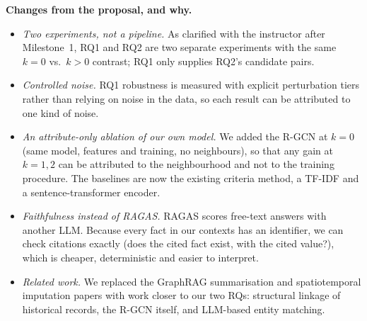 \textbf{Changes from the proposal, and why.}
\begin{itemize}
\item \emph{Two experiments, not a pipeline.} As clarified with the instructor after Milestone~1, RQ1 and RQ2 are two separate experiments with the same $k=0$ vs.\ $k>0$ contrast; RQ1 only supplies RQ2's candidate pairs.
\item \emph{Controlled noise.} RQ1 robustness is measured with explicit perturbation tiers rather than relying on noise in the data, so each result can be attributed to one kind of noise.
\item \emph{An attribute-only ablation of our own model.} We added the R-GCN at $k=0$ (same model, features and training, no neighbours), so that any gain at $k=1,2$ can be attributed to the neighbourhood and not to the training procedure. The baselines are now the existing criteria method, a TF-IDF and a sentence-transformer encoder.
\item \emph{Faithfulness instead of RAGAS.} RAGAS scores free-text answers with another LLM. Because every fact in our contexts has an identifier, we can check citations exactly (does the cited fact exist, with the cited value?), which is cheaper, deterministic and easier to interpret.
\item \emph{Related work.} We replaced the GraphRAG summarisation and spatiotemporal imputation papers with work closer to our two RQs: structural linkage of historical records, the R-GCN itself, and LLM-based entity matching.
\end{itemize}
